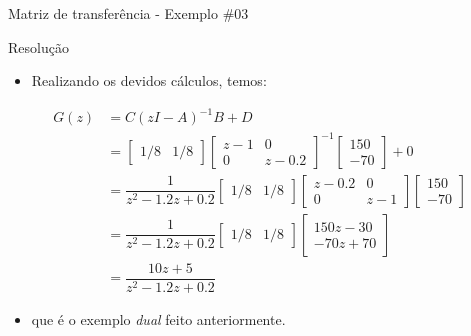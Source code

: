 \begin{frame}{Matriz de transferência - Exemplo \#03}
\begin{block}{Resolução}
\begin{itemize}
    \item Realizando os devidos cálculos, temos:
\end{itemize}
\begin{align*}
    G(z) &= C(zI - A)^{-1} B + D \\
    &= \begin{bmatrix}
    1/8 & 1/8
    \end{bmatrix}
    \begin{bmatrix}
    z-1 & 0 \\ 0 & z-\num{0,2}
    \end{bmatrix}^{-1} 
    \begin{bmatrix}
    150 \\ -70
    \end{bmatrix}
    + 0 \\
    &= \dfrac{1}{z^2-\num{1,2}z+\num{0,2}}
    \begin{bmatrix}
    1/8 & 1/8
    \end{bmatrix}
    \begin{bmatrix}
    z-\num{0,2} & 0 \\ 0 & z-1
    \end{bmatrix}
    \begin{bmatrix}
    150 \\ -70
    \end{bmatrix} \\
    &= \dfrac{1}{z^2-\num{1,2}z+\num{0,2}}
    \begin{bmatrix}
    1/8 & 1/8
    \end{bmatrix}
    \begin{bmatrix}
    150z-30 \\ -70z+70
    \end{bmatrix} \\
    &= \dfrac{10z+5}{z^2-\num{1,2}z+\num{0,2}}
\end{align*}
\vspace{-0.3cm}
\begin{itemize}
    \item[] que é o exemplo \textit{dual} feito anteriormente.
\end{itemize}
\end{block}
\end{frame}

